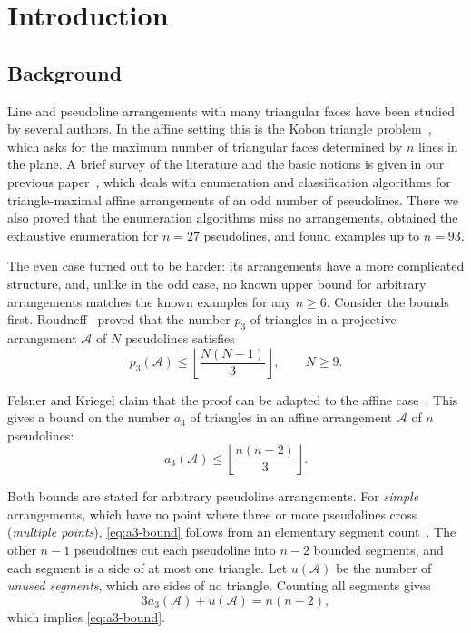 \section{Introduction}\label{sec:intro}

\subsection{Background}

Line and pseudoline arrangements with many triangular faces have been studied by several authors. In the affine setting this is the Kobon triangle problem~\cite{fujimura78,a006066}, which asks for the maximum number of triangular faces determined by $n$ lines in the plane. A brief survey of the literature and the basic notions is given in our previous paper~\cite{pu26b}, which deals with enumeration and classification algorithms for triangle-maximal affine arrangements of an odd number of pseudolines. There we also proved that the enumeration algorithms miss no arrangements, obtained the exhaustive enumeration for $n=27$ pseudolines, and found examples up to $n=93$.

The even case turned out to be harder: its arrangements have a more complicated structure, and, unlike in the odd case, no known upper bound for arbitrary arrangements matches the known examples for any $n\ge6$. Consider the bounds first. Roudneff~\cite{roudneff96} proved that the number $p_3$ of triangles in a projective arrangement $\mathcal{A}$ of $N$ pseudolines satisfies
\begin{equation}\label{eq:p3-bound}
p_3(\mathcal{A})\le\left\lfloor\frac{N(N-1)}{3}\right\rfloor,\qquad N\ge 9.
\end{equation}

Felsner and Kriegel claim that the proof can be adapted to the affine case~\cite[Theorem~2(3)]{fk99}. This gives a bound on the number $a_3$ of triangles in an affine arrangement $\mathcal{A}$ of $n$ pseudolines:
\begin{equation}\label{eq:a3-bound}
a_3(\mathcal{A})\le\left\lfloor\frac{n(n-2)}{3}\right\rfloor.
\end{equation}

Both bounds are stated for arbitrary pseudoline arrangements. For \emph{simple} arrangements, which have no point where three or more pseudolines cross (\emph{multiple points}), \eqref{eq:a3-bound} follows from an elementary segment count~\cite[Subsection~2.3]{pu26b}. The other $n-1$ pseudolines cut each pseudoline into $n-2$ bounded segments, and each segment is a side of at most one triangle. Let $u(\mathcal A)$ be the number of \emph{unused segments}, which are sides of no triangle. Counting all segments gives
\begin{equation}\label{eq:simple-segm}
3a_3(\mathcal{A})+u(\mathcal{A})=n(n-2),
\end{equation}
which implies \eqref{eq:a3-bound}.


